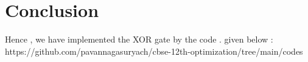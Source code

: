 \documentclass[10pt,a4paper]{article}
\begin{document}
     \section{Conclusion}
	     Hence , we have implemented the XOR gate by the code . given below : \\
             https://github.com/pavannagasuryach/cbse-12th-optimization/tree/main/codes
\end{document}
